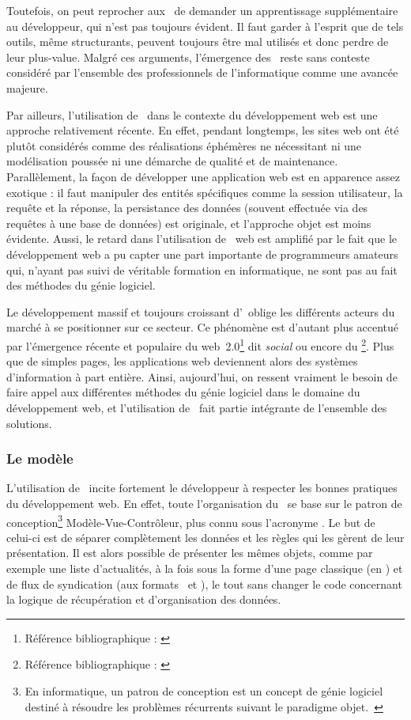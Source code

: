 Toutefois, on peut reprocher aux \afms\ de demander un apprentissage supplémentaire au développeur, qui n'est pas toujours évident. Il faut garder à l'esprit que de tels outils, même structurants, peuvent toujours être mal utilisés et donc perdre de leur plus-value. Malgré ces arguments, l'émergence des \afms\ reste sans conteste considéré par l'ensemble des professionnels de l'informatique comme une avancée majeure.

Par ailleurs, l'utilisation de \afms\ dans le contexte du développement web est une approche relativement récente. En effet, pendant longtemps, les sites web ont été plutôt considérés comme des réalisations éphémères ne nécessitant ni une modélisation poussée ni une démarche de qualité et de maintenance. Parallèlement, la façon de développer une application web est en apparence assez exotique : il faut manipuler des entités spécifiques comme la session utilisateur, la requête et la réponse, la persistance des données (souvent effectuée via des requêtes à une base de données) est originale, et l'approche objet est moins évidente. Aussi, le retard dans l'utilisation de \afms\ web est amplifié par le fait que le développement web a pu capter une part importante de programmeurs amateurs qui, n'ayant pas suivi de véritable formation en informatique, ne sont pas au fait des méthodes du génie logiciel.

Le développement massif et toujours croissant d'\ainternet\ oblige les dif\-fé\-rents acteurs du marché à se positionner sur ce secteur. Ce phénomène est d'autant plus accentué par l'émergence récente et populaire du web~2.0\footnote{Référence bibliographique : \cite{webdeux}} dit \emph{social} ou encore du \acloud\footnote{Référence bibliographique : \cite{cloud}}. Plus que de simples pages, les applications web deviennent alors des systèmes d'information à part entière. Ainsi, aujourd'hui, on ressent vraiment le besoin de faire appel aux différentes méthodes du génie logiciel dans le domaine du développement web, et l'utilisation de \afm\ fait partie intégrante de l'ensemble des solutions.


\subsubsection{Le modèle \amvc}

L'utilisation de \asf\ incite fortement le développeur à respecter les bonnes pratiques du développement web. En effet, toute l'organisation du \afm\ se base sur le patron de conception\footnote{En informatique, un patron de conception est un concept de génie logiciel destiné à résoudre les problèmes récurrents suivant le paradigme objet.~\cite{designpattern}} Modèle-Vue-Contrôleur, plus connu sous l'acronyme \amvc. Le but de celui-ci est de séparer complètement les données et les
règles qui les gèrent de leur présentation. Il est alors possible de présenter les mêmes objets, comme par exemple une liste d'actualités, à la fois sous la forme d'une page classique (en \ahtml) et de flux de syndication (aux formats \arss\ et \aatom), le tout sans changer le code concernant la logique de récupération et d'organisation des données.

